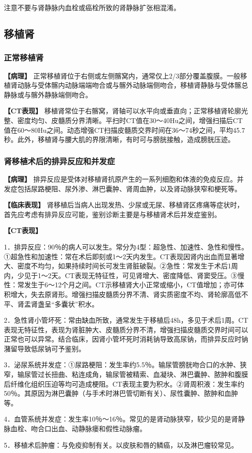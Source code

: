 注意不要与肾静脉内血栓或癌栓所致的肾静脉扩张相混淆。

\subsection{移植肾}

\subsubsection{正常移植肾}

\textbf{【病理】}
正常移植肾位于右侧或左侧髂窝内，通常仅上2/3部分覆盖腹膜。一般移植肾动脉与受体髂内动脉端端吻合或与髂外动脉端侧吻合，移植肾静脉与受体髂总静脉或与髂外静脉端侧吻合。

\textbf{【CT表现】}
移植肾常位于右髂窝，肾轴可以水平向或垂直向；正常移植肾轮廓光整、密度均匀、皮髓质分界清晰。平扫时CT值在30～40Hu之间，增强扫描后CT值在60～80Hu之间。动态增强CT扫描皮髓质交界时间在36～74秒之间，平均45.7秒。此外，移植肾与腰大肌的界限清晰，有时可与膀胱接触，造成膀胱压迹。

\subsubsection{肾移植术后的排异反应和并发症}

\textbf{【病理】}
排异反应是受体对移植肾抗原产生的一系列细胞和体液的免疫反应。并发症包括尿路梗阻、尿外渗、淋巴囊肿、肾周血肿，以及肾动脉狭窄和梗死等。

\textbf{【临床表现】}
肾移植后当病人出现发热、少尿或无尿、移植肾区疼痛等症状时，首先应考虑有排异反应可能，鉴别诊断主要是与移植肾术后并发症鉴别。

\textbf{【CT表现】}

1．排异反应：90％的病人可以发生。常分为4型：超急性、加速性、急性和慢性。①超急性和加速性：常在术后即刻或1～2天内发生。CT表现因肾内出血而显著增大、密度不均匀，如果持续时间长可发生肾脏破裂。②急性：常发生于术后1周内，少见于1～2天。CT表现无特征性，可见肾增大、密度降低、肾窦受压。③慢性：常发生于6～12个月之间。CT示移植肾大小正常或缩小，CT值增加；亦可体积增大，失去原肾形。增强扫描皮髓质分界不清、肾实质密度不均、肾轮廓高低不平、肾盂肾盏呈“多囊状”积水。

2．急性肾小管坏死：常由缺血所致，通常发生于移植后48h，多见于术后1周。CT表现无特征性，表现为肾脏肿大、皮髓质分界不清，增强扫描皮髓质交界时间可以正常也可以异常。结合临床，因肾小管坏死时消耗钠导致高尿钠，而排异反应时钠潴留导致低尿钠可予鉴别。

3．泌尿系统并发症：①尿路梗阻：发生率约5.5％。输尿管膀胱吻合口的水肿、狭窄，输尿管过长扭曲、粘连成角，输尿管被精索、血凝块、淋巴囊肿、脓肿和腹膜后纤维化组织压迫等均可造成梗阻。CT表现主要为积水。②肾周积液：发生率约50％。其原因为淋巴囊肿（与手术时淋巴管切断有关）、尿性囊肿、脓肿和血肿等。

4．血管系统并发症：发生率10％～16％。常见的是肾动脉狭窄，较少见的是肾静脉血栓、吻合口出血、动静脉瘘和假性动脉瘤。

5．移植术后肿瘤：与免疫抑制有关。以皮肤和唇的鳞癌，以及淋巴瘤较常见。

\protect\hypertarget{text00023.html}{}{}

